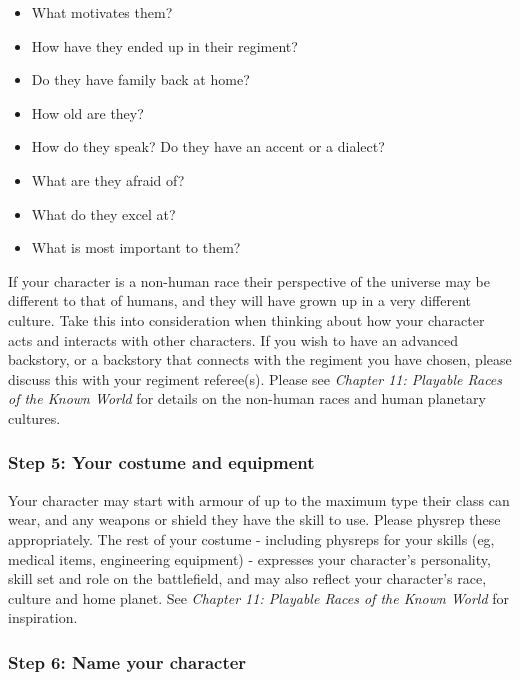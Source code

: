 \begin{itemize}
\item What motivates them?

\item How have they ended up in their regiment?

\item Do they have family back at home?

\item How old are they?

\item How do they speak? Do they have an accent or a dialect?

\item What are they afraid of?

\item What do they excel at?

\item What is most important to them?

\end{itemize}
If your character is a non-human race their perspective of the universe may be different to that of humans, and they will have grown up in a very different culture. Take this into consideration when thinking about how your character acts and interacts with other characters. If you wish to have an advanced backstory, or a backstory that connects with the regiment you have chosen, please discuss this with your regiment referee(s). Please see \textit{Chapter 11: Playable Races of the Known World} for details on the non-human races and human planetary cultures.

\subsubsection{Step 5: Your costume and equipment}

Your character may start with armour of up to the maximum type their class can wear, and any weapons or shield they have the skill to use. Please physrep these appropriately. The rest of your costume - including physreps for your skills (eg, medical items, engineering equipment) - expresses your character's personality, skill set and role on the battlefield, and may also reflect your character's race, culture and home planet. See \textit{Chapter 11: Playable Races of the Known World} for inspiration.

\subsubsection{Step 6: Name your character}

